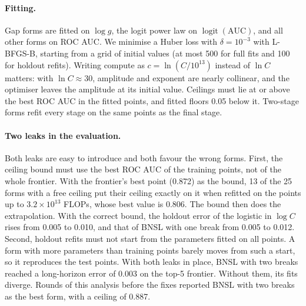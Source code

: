 \paragraph{Fitting.}
Gap forms are fitted on $\log g$, the logit power law on $\operatorname{logit}(\text{AUC})$, and all other forms on
ROC AUC. We minimise a Huber loss with $\delta=10^{-3}$ with L-BFGS-B, starting from a grid of initial values (at most
500 for full fits and 100 for holdout refits). Writing compute as $c=\ln(C/10^{13})$ instead of $\ln C$ matters: with
$\ln C\approx30$, amplitude and exponent are nearly collinear, and the optimiser leaves the amplitude at its initial
value. Ceilings must lie at or above the best ROC AUC in the fitted points, and fitted floors 0.05 below it. Two-stage
forms refit every stage on the same points as the final stage.

\paragraph{Two leaks in the evaluation.}
Both leaks are easy to introduce and both favour the wrong forms. First, the ceiling bound must use the best ROC AUC
of the training points, not of the whole frontier. With the frontier's best point (0.872) as the bound, 13 of the 25
forms with a free ceiling put their ceiling exactly on it when refitted on the points up to $3.2\times10^{13}$ FLOPs,
whose best value is 0.806. The bound then does the extrapolation. With the correct bound, the holdout error of the
logistic in $\log C$ rises from 0.005 to 0.010, and that of BNSL with one break from 0.005 to 0.012. Second, holdout
refits must not start from the parameters fitted on all points. A form with more parameters than training points
barely moves from such a start, so it reproduces the test points. With both leaks in place, BNSL with two breaks reached a
long-horizon error of 0.003 on the top-5 frontier. Without them, its fits diverge. Rounds of this
analysis before the fixes reported BNSL with two breaks as the best form, with a ceiling of 0.887.

